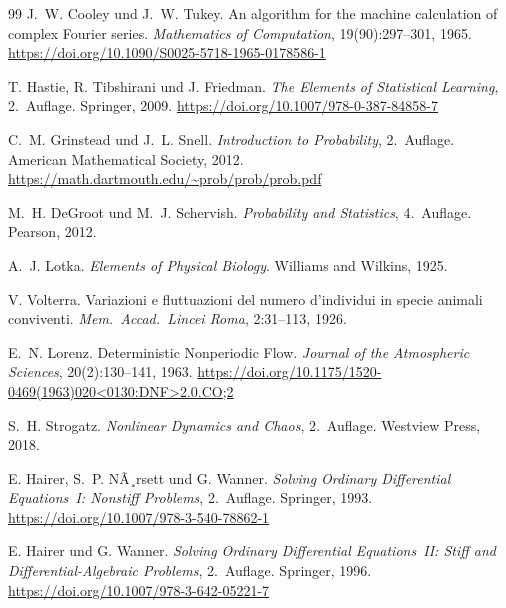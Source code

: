 \documentclass[12pt, a4paper]{article}
\begin{document}
\begin{thebibliography}{99}
J.~W. Cooley und J.~W. Tukey.
An algorithm for the machine calculation of complex {Fourier} series.
\textit{Mathematics of Computation}, 19(90):297--301, 1965.
\url{https://doi.org/10.1090/S0025-5718-1965-0178586-1}


T. Hastie, R. Tibshirani und J. Friedman.
\textit{The Elements of Statistical Learning}, 2.~Auflage.
Springer, 2009.
\url{https://doi.org/10.1007/978-0-387-84858-7}

C.~M. Grinstead und J.~L. Snell.
\textit{Introduction to Probability}, 2.~Auflage.
American Mathematical Society, 2012.
\url{https://math.dartmouth.edu/~prob/prob/prob.pdf}

M.~H. DeGroot und M.~J. Schervish.
\textit{Probability and Statistics}, 4.~Auflage.
Pearson, 2012.


A.~J. Lotka.
\textit{Elements of Physical Biology}.
Williams and Wilkins, 1925.

V. Volterra.
Variazioni e fluttuazioni del numero d'individui in specie animali conviventi.
\textit{Mem.~Accad.~Lincei Roma}, 2:31--113, 1926.

E.~N. Lorenz.
Deterministic Nonperiodic Flow.
\textit{Journal of the Atmospheric Sciences}, 20(2):130--141, 1963.
\url{https://doi.org/10.1175/1520-0469(1963)020<0130:DNF>2.0.CO;2}

S.~H. Strogatz.
\textit{Nonlinear Dynamics and Chaos}, 2.~Auflage.
Westview Press, 2018.

E. Hairer, S.~P. NÃ¸rsett und G. Wanner.
\textit{Solving Ordinary Differential Equations~I: Nonstiff Problems},
2.~Auflage. Springer, 1993.
\url{https://doi.org/10.1007/978-3-540-78862-1}

E. Hairer und G. Wanner.
\textit{Solving Ordinary Differential Equations~II: Stiff and
Differential-Algebraic Problems}, 2.~Auflage. Springer, 1996.
\url{https://doi.org/10.1007/978-3-642-05221-7}


\end{thebibliography}
\end{document}
